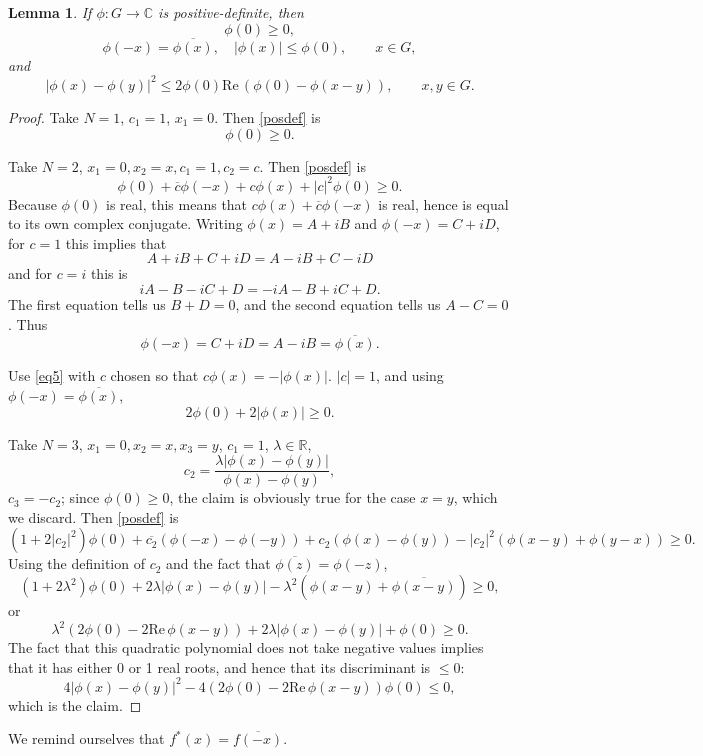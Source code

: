 \documentclass{article}
\def\Re{\ensuremath{\mathrm{Re}}\,}
\newtheorem{lemma}[theorem]{Lemma}
\begin{document}
\begin{lemma}
If $\phi:G \to \mathbb{C}$ is positive-definite, then
\[
\phi(0) \geq 0,
\]
\[
\phi(-x)=\overline{\phi(x)}, \quad |\phi(x)| \leq \phi(0), \qquad x \in G,
\]
and
\[
|\phi(x)-\phi(y)|^2 \leq 2\phi(0) \Re(\phi(0)-\phi(x-y)), \qquad x,y \in G.
\]
\label{posdeflemma}
\end{lemma}
\begin{proof}
Take $N=1$, $c_1=1$, $x_1=0$. Then \eqref{posdef} is
\[
\phi(0) \geq 0.
\]

Take $N=2$, $x_1=0, x_2=x, c_1=1,c_2=c$. Then \eqref{posdef} is
\begin{equation}
\phi(0)+\overline{c}\phi(-x)+c\phi(x)+|c|^2 \phi(0) \geq 0.
\label{eq5}
\end{equation}
Because $\phi(0)$ is real, this means that $c\phi(x)+\overline{c}\phi(-x)$ is real, hence is equal to its own complex conjugate.
Writing $\phi(x)=A+iB$ and $\phi(-x)=C+iD$, for $c=1$ this implies that
\[
A+iB + C+iD = A-iB + C - iD
\]
and for $c=i$ this is
\[
iA-B -iC + D = -iA -B+iC +D.
\]
The first equation tells us $B+D=0$, and the second equation tells us $A-C=0$. Thus
\[
\phi(-x) = C+iD = A -iB = \overline{\phi(x)}.
\]

Use \eqref{eq5} with $c$ chosen so that $c\phi(x)=-|\phi(x)|$.  $|c|=1$, and using $\phi(-x)=\overline{\phi(x)}$,
\[
2\phi(0) + 2|\phi(x)| \geq 0.
\]

Take $N=3$, $x_1=0, x_2=x, x_3=y$, $c_1=1$, $\lambda \in \mathbb{R}$,
\[
c_2 = \frac{\lambda |\phi(x)-\phi(y)|}{\phi(x)-\phi(y)},
\]
$c_3=-c_2$; since $\phi(0) \geq 0$, the claim is obviously true for the case $x=y$, which we discard. Then \eqref{posdef} is
\[
(1+2|c_2|^2)\phi(0) +\overline{c_2}(\phi(-x)-\phi(-y))+c_2(\phi(x)-\phi(y))-|c_2|^2( \phi(x-y)+ \phi(y-x)) \geq 0.
\]
Using the definition of $c_2$ and the fact that $\overline{\phi(z)}=\phi(-z)$,
\[
(1+2\lambda^2) \phi(0) +2\lambda  |\phi(x)-\phi(y)| -\lambda^2 ( \phi(x-y)+ \overline{\phi(x-y)}) \geq 0,
\]
or
\[
\lambda^2(2\phi(0)- 2\Re \phi(x-y))  +2\lambda |\phi(x)-\phi(y)| +\phi(0) \geq 0.
\]
The fact that this quadratic polynomial does not take negative values implies that it has either 0 or 1 real roots, and hence that its discriminant
is $\leq 0$:
\[
4|\phi(x)-\phi(y)|^2  - 4(2\phi(0)- 2\Re \phi(x-y)) \phi(0) \leq 0,
\]
which is the claim.
\end{proof}

We remind ourselves that $f^*(x)=\overline{f(-x)}$.
\end{document}
